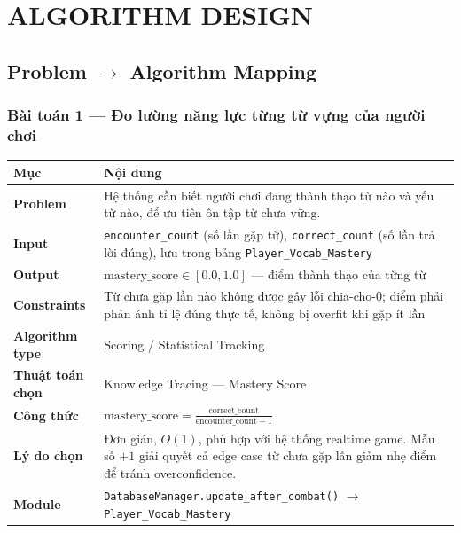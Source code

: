 \section{ALGORITHM DESIGN}

\subsection{Problem $\rightarrow$ Algorithm Mapping}

\subsubsection{Bài toán 1 — Đo lường năng lực từng từ vựng của người chơi}
\begin{tabularx}{\textwidth}{|l|X|}
\toprule
\textbf{Mục} & \textbf{Nội dung} \\
\midrule
\textbf{Problem} & Hệ thống cần biết người chơi đang thành thạo từ nào và yếu từ nào, để ưu tiên ôn tập từ chưa vững. \\
\textbf{Input} & \texttt{encounter\_count} (số lần gặp từ), \texttt{correct\_count} (số lần trả lời đúng), lưu trong bảng \texttt{Player\_Vocab\_Mastery} \\
\textbf{Output} & $\text{mastery\_score} \in [0.0, 1.0]$ — điểm thành thạo của từng từ \\
\textbf{Constraints} & Từ chưa gặp lần nào không được gây lỗi chia-cho-0; điểm phải phản ánh tỉ lệ đúng thực tế, không bị overfit khi gặp ít lần \\
\textbf{Algorithm type} & Scoring / Statistical Tracking \\
\textbf{Thuật toán chọn} & Knowledge Tracing — Mastery Score \\
\textbf{Công thức} & $\text{mastery\_score} = \frac{\text{correct\_count}}{\text{encounter\_count} + 1}$ \\
\textbf{Lý do chọn} & Đơn giản, $O(1)$, phù hợp với hệ thống realtime game. Mẫu số $+1$ giải quyết cả edge case từ chưa gặp lẫn giảm nhẹ điểm để tránh overconfidence. \\
\textbf{Module} & \texttt{DatabaseManager.update\_after\_combat()} $\rightarrow$ \texttt{Player\_Vocab\_Mastery} \\
\bottomrule
\end{tabularx}

\vspace{0.5cm}

